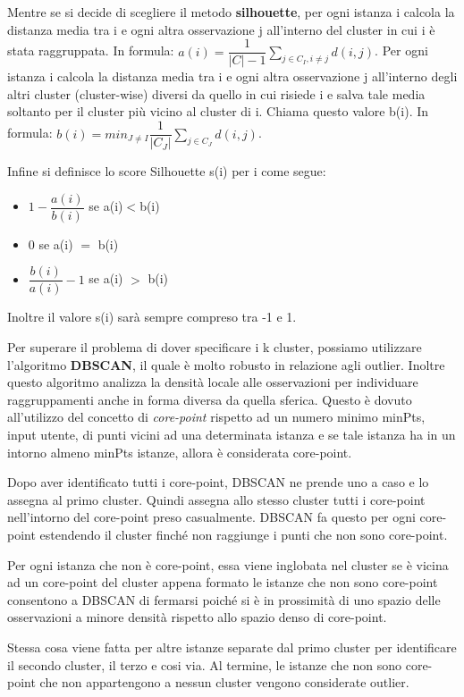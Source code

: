 \documentclass[a4paper]{extarticle}
\begin{document}
Mentre se si decide di scegliere il metodo \textbf{silhouette}, per ogni istanza i calcola la distanza media tra i e ogni altra osservazione j all'interno del cluster in cui i è stata raggruppata. In formula: $a(i) = \dfrac{1}{|C|-1} \sum_{j \in C_I, i \not = j} d(i,j)$. Per ogni istanza i calcola la distanza media tra i e ogni altra osservazione j all’interno degli altri cluster (cluster-wise) diversi da quello in cui risiede i e salva tale media soltanto per il cluster più vicino al cluster di i. Chiama questo valore b(i). In formula: $b(i) = min_{J \not = I} \dfrac{1}{|C_J|} \sum_{j\in C_J} d(i,j)$.

Infine si definisce lo score Silhouette s(i) per i come segue:
\begin{itemize}
\item $1 - \dfrac{a(i)}{b(i)}$ se a(i)$<$b(i)
\item 0 se a(i) $=$ b(i)
\item $\dfrac{b(i)}{a(i)} - 1$ se a(i) $>$ b(i)
\end{itemize}

Inoltre il valore s(i) sarà sempre compreso tra -1 e 1.

Per superare il problema di dover specificare i k cluster, possiamo utilizzare l'algoritmo \textbf{DBSCAN}, il quale è molto robusto in relazione agli outlier. Inoltre questo algoritmo analizza la densità locale alle osservazioni per individuare raggruppamenti anche in forma diversa da quella sferica. Questo è dovuto all'utilizzo del concetto di \textit{core-point} rispetto ad un numero minimo minPts, input utente, di punti vicini ad una determinata istanza e se tale istanza ha in un intorno almeno minPts istanze, allora è considerata core-point.

Dopo aver identificato tutti i core-point, DBSCAN ne prende uno a caso e lo assegna al primo cluster. Quindi assegna allo stesso cluster tutti i core-point nell'intorno del core-point preso casualmente. DBSCAN fa questo per ogni core-point estendendo il cluster finché non raggiunge i punti che non sono core-point.

Per ogni istanza che non è core-point, essa viene inglobata nel cluster se è vicina ad un core-point del cluster appena formato
le istanze che non sono core-point consentono a DBSCAN di fermarsi poiché si è in prossimità di uno spazio delle osservazioni a minore densità rispetto allo spazio denso di core-point.

Stessa cosa viene fatta per altre istanze separate dal primo cluster per identificare il secondo cluster, il terzo e cosi via. Al termine, le istanze che non sono core-point che non appartengono a nessun cluster vengono considerate outlier.
\end{document}
